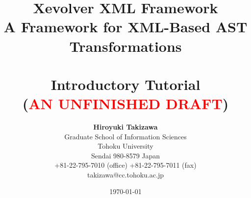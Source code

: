 \documentclass[10pt]{book}
\newcommand{\todo}[1]{\textcolor{red}{#1}}
\begin{document}
\title{ {\bf {Xevolver XML Framework}}\\
A Framework for XML-Based AST Transformations \\
~\\
\bf{Introductory Tutorial \\ (\todo{AN UNFINISHED DRAFT})}}

\author{ {\bf Hiroyuki Takizawa} \\
Graduate School of Information Sciences\\
Tohoku University\\
Sendai 980-8579 Japan\\
+81-22-795-7010 (office)  +81-22-795-7011 (fax) \\
takizawa@cc.tohoku.ac.jp
       }
\date{\today}

\maketitle




\tableofcontents







\appendix




\end{document}

